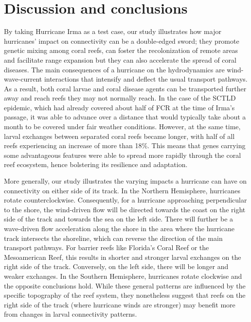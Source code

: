 \documentclass[fleqn,10pt]{wlscirep}
\newcommand{\modif}[1]{{#1}}
\begin{document}
\section{Discussion and conclusions}

By taking Hurricane Irma as a test case, our study illustrates how major hurricanes' impact on connectivity can be a double-edged sword; they promote genetic mixing among coral reefs, can foster the recolonization of remote areas and facilitate range expansion but they can also accelerate the spread of coral diseases. The main consequences of a hurricane on the hydrodynamics are wind-wave-current interactions that intensify and deflect the usual transport pathways. As a result, both coral larvae and coral disease agents can be transported further away and reach reefs they \modif{may} not normally reach. In the case of the SCTLD epidemic, which had already covered about half of FCR at the time of Irma's passage, it was able to advance over a distance that would typically take about a month to be covered under fair weather conditions. However, at the same time, larval exchanges between separated coral reefs became longer, with half of all reefs experiencing an increase of more than 18\%. This means that genes carrying some advantageous features were able to spread more rapidly through the coral reef ecosystem, hence bolstering its resilience and adaptation.

More generally, our study illustrates the varying impacts a hurricane can have on connectivity on either side of its track. In the Northern Hemisphere, hurricanes rotate counterclockwise. Consequently, for a hurricane approaching perpendicular to the shore, the wind-driven flow will be directed towards the coast on the right side of the track and towards the sea on the left side. There will further be a wave-driven flow acceleration along the shore in the area where the hurricane track intersects the shoreline, which can reverse the direction of the main transport pathways. For barrier reefs like Florida's Coral Reef or the Mesoamerican Reef, this results in shorter and stronger larval exchanges on the right side of the track. Conversely, on the left side, there will be longer and weaker exchanges. In the Southern Hemisphere, hurricanes rotate clockwise and the opposite conclusions hold. While these general patterns are influenced by the specific topography of the reef system, they nonetheless suggest that reefs on the right side of the track (where hurricane winds are stronger) may benefit more from changes in larval connectivity patterns.
\end{document}
